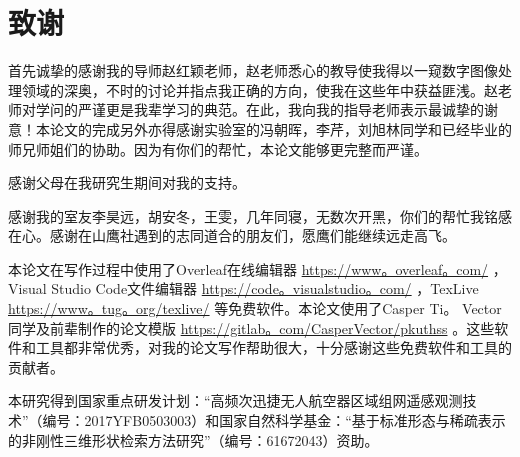 
\chapter{致谢}
首先诚挚的感谢我的导师赵红颖老师，赵老师悉心的教导使我得以一窥数字图像处理领域的深奥，不时的讨论并指点我正确的方向，使我在这些年中获益匪浅。赵老师对学问的严谨更是我辈学习的典范。在此，我向我的指导老师表示最诚挚的谢意！本论文的完成另外亦得感谢实验室的冯朝晖，李芹，刘旭林同学和已经毕业的师兄师姐们的协助。因为有你们的帮忙，本论文能够更完整而严谨。
\par
感谢父母在我研究生期间对我的支持。
\par
感谢我的室友李昊远，胡安冬，王雯，几年同寝，无数次开黑，你们的帮忙我铭感在心。感谢在山鹰社遇到的志同道合的朋友们，愿鹰们能继续远走高飞。
\par
本论文在写作过程中使用了Overleaf在线编辑器 \url{https://www。overleaf。com/} ，Visual Studio Code文件编辑器 \url{https://code。visualstudio。com/} ，TexLive \url{https://www。tug。org/texlive/} 等免费软件。本论文使用了Casper Ti。 Vector同学及前辈制作的论文模版 \url{https://gitlab。com/CasperVector/pkuthss} 。这些软件和工具都非常优秀，对我的论文写作帮助很大，十分感谢这些免费软件和工具的贡献者。
\par
本研究得到国家重点研发计划：“高频次迅捷无人航空器区域组网遥感观测技术”（编号：2017YFB0503003）和国家自然科学基金：“基于标准形态与稀疏表示的非刚性三维形状检索方法研究”（编号：61672043）资助。


